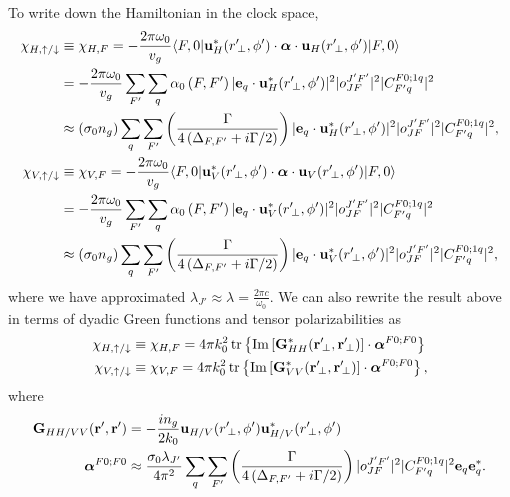 \documentclass[preprint,aps,pra,onecolumn]{revtex4-1} %
\renewcommand{\tensor}[1]{\boldsymbol{#1}}
\begin{document}
To write down the Hamiltonian in the clock space,
\begin{align}
\chi_{H,\uparrow/\downarrow} & \equiv \chi_{H,F} =- \frac{2\pi \omega_0}{v_g} \bra{F,0} 
	\mathbf{u}^*_H(r^\prime\!_\perp, \phi') \cdot \tensor{\alpha} \cdot 
	\mathbf{u}_{H}(r^\prime\!_\perp, 
	\phi') \ket{F,0} \\
	& =- \frac{2\pi \omega_0}{v_g} \sum_{F'} \sum_q \alpha_0\left( F,F'  \right) |\mathbf{e}_q \cdot 
	\mathbf{u}_H^*(r^\prime\!_\perp,\phi')|^2 |o^{J'F'}_{JF} |^2 
	|C^{F 0;1q}_{F' q}|^2\\
	& \approx  \left( \sigma_0 n_g  \right)  \sum_q \sum_{F'} \left( 
		\frac{\Gamma}{4 
		\left(\Delta_{F,F'}+i\Gamma/2\right) }  \right) |\mathbf{e}_q \cdot 
		\mathbf{u}_H^*(r^\prime\!_\perp,\phi')|^2 |o^{J'F'}_{JF} |^2 
		|C^{F 0;1q}_{F' q}|^2,\\
\chi_{V,\uparrow/\downarrow} & \equiv \chi_{V,F} =- \frac{2\pi \omega_0}{v_g} \bra{F,0} 
	\mathbf{u}^*_V(r^\prime\!_\perp, \phi') \cdot \tensor{\alpha} \cdot 
	\mathbf{u}_{V}(r^\prime\!_\perp, 
	\phi') \ket{F,0} \\
	& =- \frac{2\pi \omega_0}{v_g} \sum_{F'} \sum_q \alpha_0\left( F,F'  \right) |\mathbf{e}_q \cdot 
	\mathbf{u}_V^*(r^\prime\!_\perp,\phi')|^2 |o^{J'F'}_{JF} |^2 
	|C^{F 0;1q}_{F' q}|^2\\
	& \approx   \left( \sigma_0 n_g  \right)  \sum_q\sum_{F'} \left( 
		\frac{\Gamma}{4 
		\left(\Delta_{F,F'}+i\Gamma/2\right) }  \right) |\mathbf{e}_q \cdot 
		\mathbf{u}_V^*(r^\prime\!_\perp,\phi')|^2 |o^{J'F'}_{JF} |^2 
		|C^{F 0;1q}_{F' q}|^2,\\
\end{align}
where we have approximated $ \lambda_{J'}\approx \lambda = \frac{2\pi c}{\omega_0} $.  We can also 
rewrite the result above in terms of dyadic Green functions and tensor polarizabilities as
\begin{align}
\chi_{H,\uparrow/\downarrow} & \equiv \chi_{H,F} = 4\pi k_0^2 \operatorname{tr} \left\{ \mathrm{Im}\left[ 
\mathbf{G}^*_{HH}(\mathbf{r}^\prime\!_\perp,\mathbf{r}^\prime\!_\perp) \right] \cdot \boldsymbol{\alpha}^{F0;F0} 
\right\}\\
\chi_{V,\uparrow/\downarrow} & \equiv \chi_{V,F} = 4\pi k_0^2 \operatorname{tr} \left\{ \mathrm{Im}\left[ 
\mathbf{G}^*_{VV}(\mathbf{r}^\prime\!_\perp,\mathbf{r}^\prime\!_\perp) \right] \cdot \boldsymbol{\alpha}^{F0;F0} 
\right\},
\end{align}
where 
\begin{align} 
\mathbf{G}_{HH/VV}(\mathbf{r}',\mathbf{r}') &= -\frac{in_g}{2k_0} 
\mathbf{u}_{H/V}(r^\prime\!_\perp,\phi')\mathbf{u}_{H/V}^*(r^\prime\!_\perp,\phi')\\
\boldsymbol{\alpha}^{F0;F0} &\approx \frac{\sigma_0\lambda_{J'}}{4\pi^2}  \sum_q \sum_{F'} \left( 
		\frac{\Gamma}{4 
		\left(\Delta_{F,F'}+i\Gamma/2\right) }  \right)   |o^{J'F'}_{JF} |^2 
		|C^{F 0;1q}_{F' q}|^2  \mathbf{e}_q \mathbf{e}_q^*.
\end{align}
\end{document}
